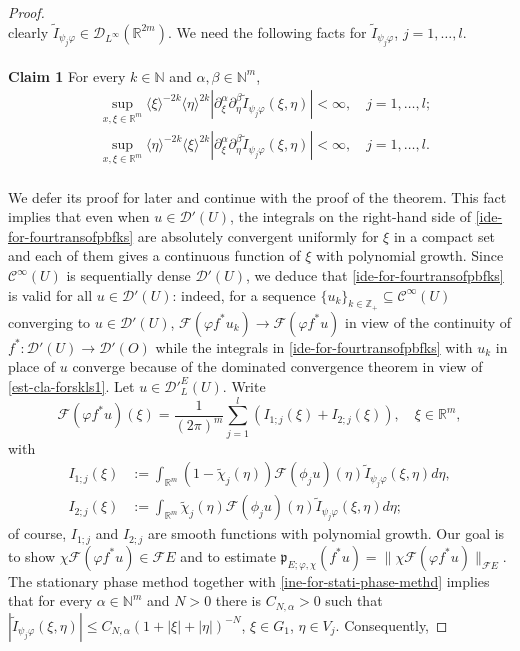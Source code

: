 \documentclass[12pt,reqno]{amsart}
\newcommand{\NN}{\mathbb N}
\newcommand{\RR}{\mathbb R}
\newcommand{\ZZ}{\mathbb Z}
\newcommand{\DD}{\mathcal D}
\theoremstyle{plain}
\theoremstyle{remark}
\theoremstyle{definition}
\numberwithin{equation}{section}
\begin{document}
\begin{proof}
\begin{equation*}
\end{equation*}
clearly $\widetilde{I}_{\psi_j\varphi}\in\DD_{L^{\infty}}(\RR^{2m})$. We need the following facts for $\widetilde{I}_{\psi_j\varphi}$, $j=1,\ldots,l$.\\
\\
\noindent \textbf{Claim 1} For every $k\in\NN$ and $\alpha,\beta\in\NN^m$,
\begin{align}
&\sup_{x,\xi\in\RR^m}\langle\xi\rangle^{-2k}\langle\eta\rangle^{2k} |\partial^{\alpha}_{\xi}\partial^{\beta}_{\eta}\widetilde{I}_{\psi_j\varphi}(\xi,\eta)|<\infty,\quad j=1,\ldots,l;\label{est-cla-forskls1}\\
&\sup_{x,\xi\in\RR^m}\langle\eta\rangle^{-2k}\langle\xi\rangle^{2k} |\partial^{\alpha}_{\xi}\partial^{\beta}_{\eta}\widetilde{I}_{\psi_j\varphi}(\xi,\eta)|<\infty,\quad j=1,\ldots,l.\label{est-cla-forskls2}
\end{align}
\\
\indent We defer its proof for later and continue with the proof of the theorem. This fact implies that even when $u\in\DD'(U)$, the integrals on the right-hand side of \eqref{ide-for-fourtransofpbfks} are absolutely convergent uniformly for $\xi$ in a compact set and each of them gives a continuous function of $\xi$ with polynomial growth. Since $\mathcal{C}^{\infty}(U)$ is sequentially dense $\DD'(U)$, we deduce that \eqref{ide-for-fourtransofpbfks} is valid for all $u\in\DD'(U)$: indeed, for a sequence $\{u_k\}_{k\in\ZZ_+}\subseteq \mathcal{C}^{\infty}(U)$ converging to $u\in\DD'(U)$, $\mathcal{F}(\varphi f^*u_k)\rightarrow\mathcal{F}(\varphi f^*u)$ in view of the continuity of $f^*:\DD'(U)\rightarrow\DD'(O)$ while the integrals in \eqref{ide-for-fourtransofpbfks} with $u_k$ in place of $u$ converge because of the dominated convergence theorem in view of \eqref{est-cla-forskls1}. Let $u\in\DD'^E_L(U)$. Write
\begin{equation}\label{ine-for-bound-semin-osk111}
\mathcal{F}(\varphi f^*u)(\xi)=\frac{1}{(2\pi)^m}\sum_{j=1}^l(I_{1;j}(\xi)+I_{2;j}(\xi)),\quad \xi\in\RR^m,
\end{equation}
with
\begin{align*}
I_{1;j}(\xi)&:=\int_{\RR^m}(1-\widetilde{\chi}_j(\eta))\mathcal{F}(\phi_j u)(\eta)\widetilde I_{\psi_j\varphi}(\xi,\eta)d\eta,\\
I_{2;j}(\xi)&:=\int_{\RR^m}\widetilde{\chi}_j(\eta)\mathcal{F}(\phi_j u)(\eta)\widetilde{I}_{\psi_j\varphi}(\xi,\eta)d\eta;
\end{align*}
of course, $I_{1;j}$ and $I_{2;j}$ are smooth functions with polynomial growth. Our goal is to show $\chi\mathcal{F}(\varphi f^*u)\in\mathcal{F}E$ and to estimate $\mathfrak{p}_{E;\varphi,\chi}(f^*u)=\|\chi\mathcal{F}(\varphi f^*u)\|_{\mathcal{F}E}$. The stationary phase method \cite[Theorem 7.7.1, p. 216]{hor} together with \eqref{ine-for-stati-phase-methd} implies that for every $\alpha\in\NN^m$ and $N>0$ there is $C_{N,\alpha}>0$ such that $|\widetilde{I}_{\psi_j\varphi}(\xi,\eta)|\leq C_{N,\alpha}(1+|\xi|+|\eta|)^{-N}$, $\xi\in G_1$, $\eta\in V_j$. Consequently,

\end{proof}
\end{document}
